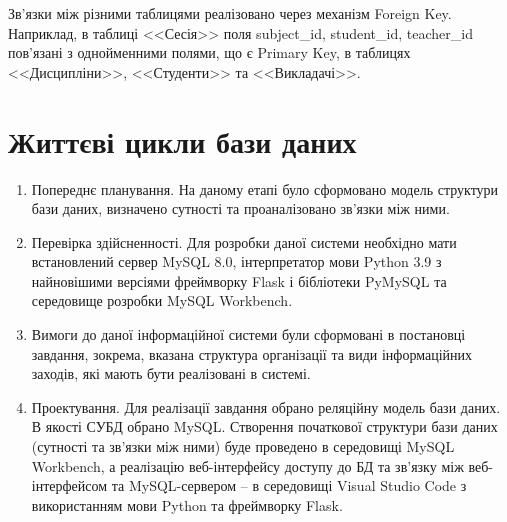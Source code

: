 Зв'язки між різними таблицями реалізовано через механізм Foreign Key.
Наприклад, в таблиці <<Сесія>> поля subject\_id, student\_id, teacher\_id 
пов'язані з однойменними полями, що є Primary Key, в таблицях <<Дисципліни>>, <<Студенти>> та <<Викладачі>>.

\section{Життєві цикли бази даних}
\begin{enumerate}
    \item Попереднє планування. На даному етапі було сформовано модель структури бази даних, визначено сутності та
    проаналізовано зв'язки між ними.
    \item Перевірка здійсненності. Для розробки даної системи необхідно мати встановлений сервер MySQL 8.0,
    інтерпретатор мови Python 3.9 з найновішими версіями фреймворку Flask і бібліотеки PyMySQL та
    середовище розробки MySQL Workbench. 
    \item Вимоги до даної інформаційної системи були сформовані в постановці завдання,
    зокрема, вказана структура організації та види інформаційних заходів, які мають бути реалізовані в системі.
    \item Проектування. Для реалізації завдання обрано реляційну модель бази даних. В якості СУБД обрано MySQL.
    Створення початкової структури бази даних (сутності та зв'язки між ними) буде проведено в середовищі MySQL Workbench,
    а реалізацію веб-інтерфейсу доступу до БД та зв'язку між веб-інтерфейсом та MySQL-сервером -- в середовищі Visual Studio Code
    з використанням мови Python та фреймворку Flask.
\end{enumerate}